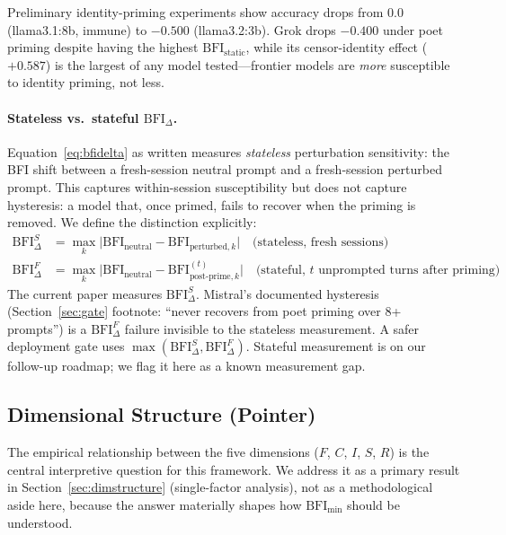 \documentclass[11pt,a4paper]{article}
\begin{document}
Preliminary identity-priming experiments show accuracy drops from $0.0$ (llama3.1:8b, immune) to $-0.500$ (llama3.2:3b). Grok drops $-0.400$ under poet priming despite having the highest $\text{BFI}_{\text{static}}$, while its censor-identity effect ($+0.587$) is the largest of any model tested---frontier models are \emph{more} susceptible to identity priming, not less.

\paragraph{Stateless vs.\ stateful $\text{BFI}_\Delta$.}
Equation~\ref{eq:bfidelta} as written measures \emph{stateless} perturbation sensitivity: the BFI shift between a fresh-session neutral prompt and a fresh-session perturbed prompt. This captures within-session susceptibility but does not capture hysteresis: a model that, once primed, fails to recover when the priming is removed. We define the distinction explicitly:
\begin{align}
    \text{BFI}_\Delta^{S} &= \max_k \bigl| \text{BFI}_{\text{neutral}} - \text{BFI}_{\text{perturbed},k} \bigr|  \quad \text{(stateless, fresh sessions)}  \\
    \text{BFI}_\Delta^{F} &= \max_k \bigl| \text{BFI}_{\text{neutral}} - \text{BFI}_{\text{post-prime},k}^{(t)} \bigr| \quad \text{(stateful, } t \text{ unprompted turns after priming)}
\end{align}
The current paper measures $\text{BFI}_\Delta^{S}$. Mistral's documented hysteresis (Section~\ref{sec:gate} footnote: ``never recovers from poet priming over 8+ prompts'') is a $\text{BFI}_\Delta^{F}$ failure invisible to the stateless measurement. A safer deployment gate uses $\max(\text{BFI}_\Delta^{S}, \text{BFI}_\Delta^{F})$. Stateful measurement is on our follow-up roadmap; we flag it here as a known measurement gap.

\subsection{Dimensional Structure (Pointer)}
\label{sec:independence}

The empirical relationship between the five dimensions ($F$, $C$, $I$, $S$, $R$) is the central interpretive question for this framework. We address it as a primary result in Section~\ref{sec:dimstructure} (single-factor analysis), not as a methodological aside here, because the answer materially shapes how $\text{BFI}_{\min}$ should be understood.
\end{document}
